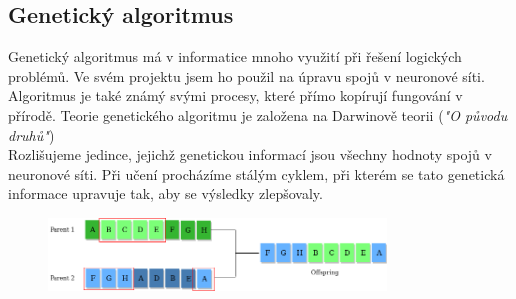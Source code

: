 \documentclass[a4paper,12pt]{article}
\newcommand{\tab}
{
    \hspace*{1em}
}
\begin{document}
    \subsection{Genetický algoritmus}
        Genetický algoritmus má v informatice mnoho využití při řešení logických problémů. 
        Ve svém projektu jsem ho použil na úpravu spojů v neuronové síti. Algoritmus je také známý svými 
        procesy, které přímo kopírují fungování v přírodě. Teorie genetického algoritmu je založena 
        na Darwinově teorii (\textit{"O původu druhů"})\\
        \tab Rozlišujeme jedince, jejichž genetickou informací jsou všechny hodnoty spojů v neuronové síti. 
        Při učení procházíme stálým cyklem, při kterém se tato genetická informace upravuje tak, 
        aby se výsledky zlepšovaly.
        \vspace{0.5cm}
        \begin{figure}[H]
            \centering
            \includegraphics[width=0.8\textwidth]{data/genetic-algorithm.png}
            \label{fig:crossover}
        \end{figure}
\end{document}
